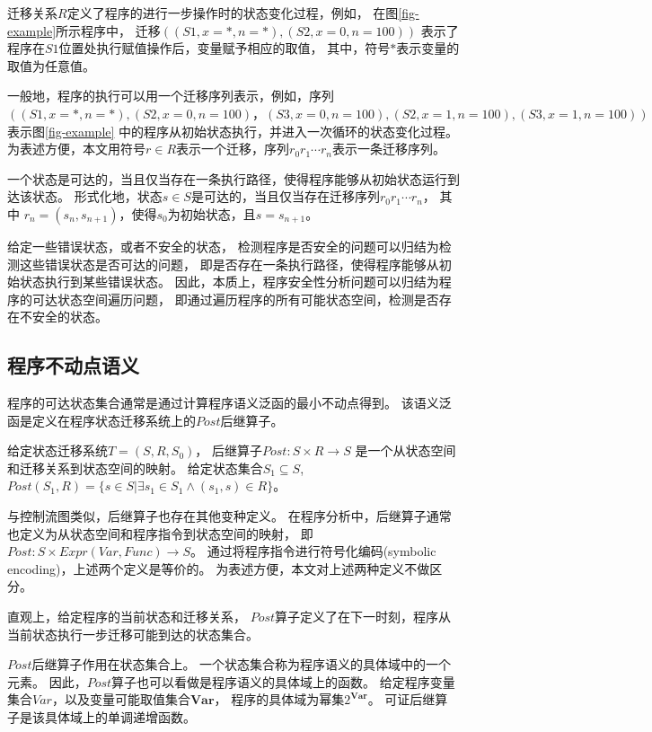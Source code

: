 迁移关系$R$定义了程序的进行一步操作时的状态变化过程，例如，
在图\ref{fig-example}所示程序中，
迁移$((S1, x=*, n=*), (S2, x=0, n=100))$
表示了程序在$S1$位置处执行赋值操作后，变量赋予相应的取值，
其中，符号$*$表示变量的取值为任意值。

一般地，程序的执行可以用一个迁移序列表示，例如，序列
$((S1, x=*, n=*), (S2, x=0, n=100)，
(S3, x=0, n=100), (S2, x=1, n=100),
(S3, x=1, n=100) )$表示图\ref{fig-example}
中的程序从初始状态执行，并进入一次循环的状态变化过程。
为表述方便，本文用符号$r\in R$表示一个迁移，序列$r_0 r_1 \cdots r_n$表示一条迁移序列。

一个状态是可达的，当且仅当存在一条执行路径，使得程序能够从初始状态运行到达该状态。
形式化地，状态$s\in S$是可达的，当且仅当存在迁移序列$r_0 r_1 \cdots r_n$，
其中 $r_n = (s_n, s_{n+1})$，使得$s_0$为初始状态，且$s = s_{n+1}$。

给定一些错误状态，或者不安全的状态，
检测程序是否安全的问题可以归结为检测这些错误状态是否可达的问题，
即是否存在一条执行路径，使得程序能够从初始状态执行到某些错误状态。
因此，本质上，程序安全性分析问题可以归结为程序的可达状态空间遍历问题，
即通过遍历程序的所有可能状态空间，检测是否存在不安全的状态。


\subsection{程序不动点语义}

程序的可达状态集合通常是通过计算程序语义泛函的最小不动点得到。
该语义泛函是定义在程序状态迁移系统上的$Post$后继算子。


\begin{definition}
给定状态迁移系统$T=(S,R,S_0)$，
后继算子$Post: S \times R \rightarrow S$
是一个从状态空间和迁移关系到状态空间的映射。
给定状态集合$S_1 \subseteq S$,
$Post(S_1, R) = \{ s\in S | \exists s_1 \in S_1 \wedge (s_1, s)\in R \}$。
\end{definition}

与控制流图类似，后继算子也存在其他变种定义。
在程序分析中，后继算子通常也定义为从状态空间和程序指令到状态空间的映射，
即$Post: S \times Expr(Var, Func) \rightarrow S$。
通过将程序指令进行符号化编码(symbolic encoding)，上述两个定义是等价的。
为表述方便，本文对上述两种定义不做区分。

直观上，给定程序的当前状态和迁移关系，
$Post$算子定义了在下一时刻，程序从当前状态执行一步迁移可能到达的状态集合。

$Post$后继算子作用在状态集合上。
一个状态集合称为程序语义的具体域中的一个元素。
因此，$Post$算子也可以看做是程序语义的具体域上的函数。
给定程序变量集合$Var$，以及变量可能取值集合$\textbf{Var}$，
程序的具体域为幂集$2^{\textbf{Var}}$。
可证后继算子是该具体域上的单调递增函数。

